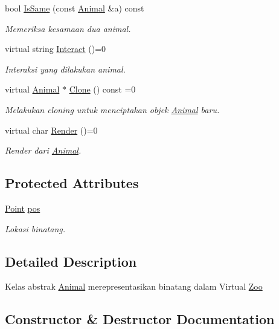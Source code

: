 \begin{DoxyCompactItemize}
bool \hyperlink{classAnimal_afc66abcbc6efb71c81d5306ea368cffb}{Is\+Same} (const \hyperlink{classAnimal}{Animal} \&a) const 
\begin{DoxyCompactList}\small\item\em Memeriksa kesamaan dua animal. \end{DoxyCompactList}\item 
virtual string \hyperlink{classAnimal_ad5a55fb0355a9425fee6611003d9892c}{Interact} ()=0
\begin{DoxyCompactList}\small\item\em Interaksi yang dilakukan animal. \end{DoxyCompactList}\item 
virtual \hyperlink{classAnimal}{Animal} $\ast$ \hyperlink{classAnimal_a3fc95e2a588b653b9b315e6c7a29c89f}{Clone} () const =0
\begin{DoxyCompactList}\small\item\em Melakukan cloning untuk menciptakan objek \hyperlink{classAnimal}{Animal} baru. \end{DoxyCompactList}\item 
virtual char \hyperlink{classAnimal_a43a47c0f41d211128e04abc6add53def}{Render} ()=0
\begin{DoxyCompactList}\small\item\em Render dari \hyperlink{classAnimal}{Animal}. \end{DoxyCompactList}\end{DoxyCompactItemize}
\subsection*{Protected Attributes}
\begin{DoxyCompactItemize}
\item 
\hyperlink{classPoint}{Point} \hyperlink{classAnimal_ae4e9a6fe53c7ebfbb00536f0e38de5c8}{pos}
\begin{DoxyCompactList}\small\item\em Lokasi binatang. \end{DoxyCompactList}\end{DoxyCompactItemize}


\subsection{Detailed Description}
Kelas abstrak \hyperlink{classAnimal}{Animal} merepresentasikan binatang dalam Virtual \hyperlink{classZoo}{Zoo} 

\subsection{Constructor \& Destructor Documentation}

